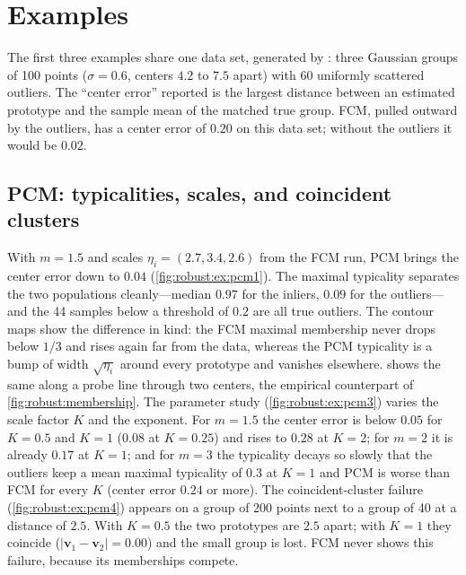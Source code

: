 \section{Examples}\label{sec:robust:examples}

The first three examples share one data set, generated by : three Gaussian groups of 100 points ($\sigma=0.6$, centers $4.2$ to $7.5$ apart) with 60 uniformly scattered outliers. The ``center error'' reported is the largest distance between an estimated prototype and the sample mean of the matched true group. FCM, pulled outward by the outliers, has a center error of $0.20$ on this data set; without the outliers it would be $0.02$.

\subsection{PCM: typicalities, scales, and coincident clusters}\label{sec:robust:ex:pcm}

With $m=1.5$ and scales $\eta_i=(2.7,3.4,2.6)$ from the FCM run, PCM brings the center error down to $0.04$ (\cref{fig:robust:ex:pcm1}). The maximal typicality separates the two populations cleanly---median $0.97$ for the inliers, $0.09$ for the outliers---and the 44 samples below a threshold of $0.2$ are all true outliers. The contour maps show the difference in kind: the FCM maximal membership never drops below $1/3$ and rises again far from the data, whereas the PCM typicality is a bump of width $\sqrt{\eta_i}$ around every prototype and vanishes elsewhere.  shows the same along a probe line through two centers, the empirical counterpart of \cref{fig:robust:membership}. The parameter study (\cref{fig:robust:ex:pcm3}) varies the scale factor $K$ and the exponent. For $m=1.5$ the center error is below $0.05$ for $K=0.5$ and $K=1$ ($0.08$ at $K=0.25$) and rises to $0.28$ at $K=2$; for $m=2$ it is already $0.17$ at $K=1$; and for $m=3$ the typicality decays so slowly that the outliers keep a mean maximal typicality of $0.3$ at $K=1$ and PCM is worse than FCM for every $K$ (center error $0.24$ or more). The coincident-cluster failure (\cref{fig:robust:ex:pcm4}) appears on a group of 200 points next to a group of 40 at a distance of $2.5$. With $K=0.5$ the two prototypes are $2.5$ apart; with $K=1$ they coincide ($|\mathbf{v}_1-\mathbf{v}_2|=0.00$) and the small group is lost. FCM never shows this failure, because its memberships compete.

